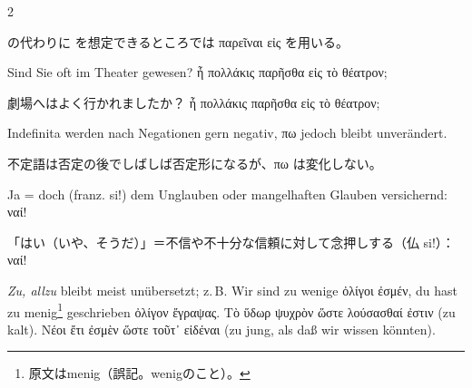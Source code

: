 \begin{paracol}{2}
\begin{enumerate}[leftmargin=0pt,rightmargin=0pt,listparindent =1cm,labelindent=1cm,labelsep=1ex,labelwidth={*},itemindent={*},align=left]
\begin{japanese}
 の代わりに  を想定できるところでは
\textgreek[variant=ancient]{παρεῖναι εἰς} を用いる。
\end{japanese}
\switchcolumn*

\begin{german}
\begin{continuousexamples}Sind Sie oft im Theater gewesen? \textgreek[variant=ancient]{ἦ
πολλάκις παρῆσθα εἰς τὸ θέατρον;}\par\end{continuousexamples}
\end{german}
\switchcolumn

\begin{japanese}
劇場へはよく行かれましたか？ \textgreek[variant=ancient]{ἦ πολλάκις παρῆσθα εἰς τὸ θέατρον;}
\end{japanese}
\switchcolumn*

\begin{german}
\item Indefinita werden nach Negationen gern negativ, \textgreek[variant=ancient]{πω}
jedoch bleibt unverändert.
\end{german}
\switchcolumn

\begin{japanese}
不定語は否定の後でしばしば否定形になるが、\textgreek[variant=ancient]{πω} は変化しない。
\end{japanese}
\switchcolumn*

\begin{german}
\item Ja = doch (franz. \textfrench{si!}) dem Unglauben oder mangelhaften
Glauben versichernd: \textgreek[variant=ancient]{ναί! }
\end{german}
\switchcolumn

\begin{japanese}
「はい（いや、そうだ）」＝不信や不十分な信頼に対して念押しする（仏 \textfrench{si!}）：
\textgreek[variant=ancient]{ναί!}
\end{japanese}
\switchcolumn*

\begin{german}
\item \emph{Zu, allzu} bleibt meist unübersetzt; z.\,B. Wir sind zu wenige
\textgreek[variant=ancient]{ὀλίγοι ἐσμέν,} du hast zu menig\footnote{\textjapanese{原文はmenig（誤記。wenigのこと）。}} geschrieben
\textgreek[variant=ancient]{ὀλίγον ἔγραψας.} \textgreek[variant=ancient]{Τὸ
ὕδωρ ψυχρὸν ὥστε λούσασθαί ἐστιν} (zu kalt). \textgreek[variant=ancient]{Νέοι
ἔτι ἐσμὲν ὥστε τοῦτ᾽ εἰδέναι} (zu jung, als daß wir wissen könnten).
\end{german}
\switchcolumn


\end{enumerate}
\end{paracol}

